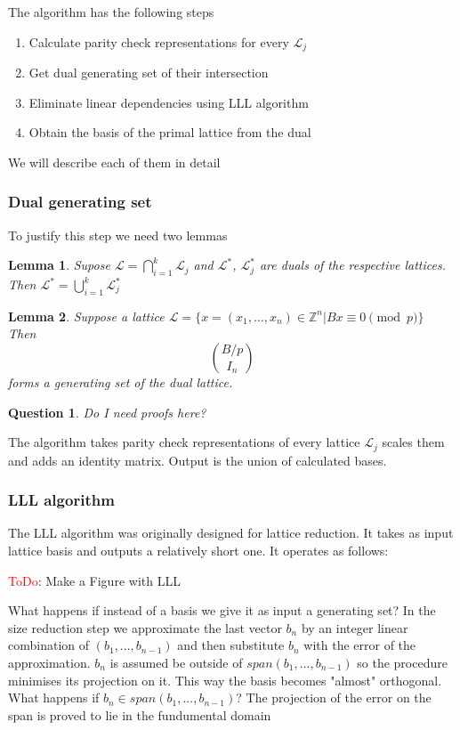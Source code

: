 \documentclass[12pt]{article}
\newcommand{\ZZ}{\mathbb{Z}}
\newcommand{\LL}{\mathcal{L}}
\newtheorem{question}{Question}
\newtheorem{lemma}{Lemma}
\begin{document}
 The algorithm has the following steps
\begin{enumerate}
    \item Calculate parity check representations for every $\LL_{j}$
    \item Get dual generating set of their intersection
    \item Eliminate linear dependencies using LLL algorithm
    \item Obtain the basis of the primal lattice from the dual
\end{enumerate}
We will describe each of them in detail
\subsubsection{Dual generating set}
To justify this step we need two lemmas
\begin{lemma}
    Supose $\LL = \bigcap_{i=1}^{k} \LL_{j}$ and $\LL^{*}$, $\LL_{j}^{*}$ are duals of the respective lattices. Then $\LL^{*} = \bigcup_{i=1}^{k} \LL_{j}^{*}$
\end{lemma}

\begin{lemma}
    Suppose a lattice $\LL = \{x = (x_{1}, ..., x_{n}) \in \ZZ^{n} | Bx \equiv 0 \pmod{p}\}$
    Then
    \[
    \binom{B/p}{I_{n}}
    \]
    forms a generating set of the dual lattice.
\end{lemma}

\begin{question}
    Do I need proofs here?
\end{question}

The algorithm takes parity check representations of every lattice $\LL_{j}$ scales them and adds an identity matrix. Output is the union of calculated bases.

\subsubsection{LLL algorithm}
The LLL algorithm was originally designed for lattice reduction. It takes as input lattice basis and outputs a relatively short one. It operates as follows:

\textcolor{red}{ToDo}: Make a Figure with LLL

What happens if instead of a basis we give it as input a generating set?
In the size reduction step we approximate the last vector $b_{n}$ by an integer linear combination of $(b_{1}, ..., b_{n-1})$ and then substitute $b_{n}$ with the error of the approximation. $b_{n}$ is assumed be outside of $span(b_{1}, ..., b_{n-1})$ so the procedure minimises its projection on it. This way the basis becomes "almost" orthogonal. What happens if $b_{n} \in span(b_{1}, ..., b_{n-1})$? The projection of the error on the span is proved to lie in the fundumental domain
\end{document}
